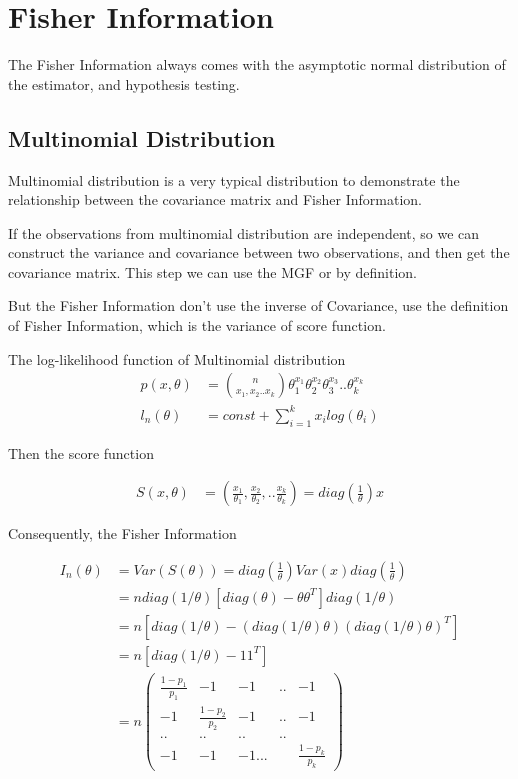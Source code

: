 \documentclass[11pt]{article} %
\begin{document}
\section{Fisher Information}

The Fisher Information always comes with the asymptotic normal distribution of the estimator, and hypothesis testing.

\subsection{Multinomial Distribution}
Multinomial distribution is a very typical distribution to demonstrate the relationship between the covariance matrix and Fisher Information.

If the observations from multinomial distribution are independent, so we can construct the variance and covariance between two observations, and then get the covariance matrix. This step we can use the MGF or by definition.

But the Fisher Information don't use the inverse of Covariance, use the definition of Fisher Information, which is the variance of score function.

The log-likelihood function of Multinomial distribution 
\begin{align*}
	p(x, \theta) &= {n \choose x_1, x_2.. x_k} \theta_1^{x_1} \theta_2^{x_2} \theta_3^{x_3}.. \theta_k^{x_k} \\
	l_n(\theta) &= const + \sum_{i=1}^k x_i log(\theta_i)
\end{align*}

Then the score function

\begin{align*}
	S(x, \theta) &= \left(\frac{x_1}{\theta_1}, \frac{x_2}{\theta_2},.. \frac{x_k}{\theta_k} \right) = diag(\frac{1}{\theta}) x
\end{align*}

Consequently, the Fisher Information

\begin{align*}
	I_n(\theta) &= Var(S(\theta)) = diag(\frac{1}{\theta}) Var(x) diag(\frac{1}{\theta})\\
	&= n diag(1/\theta) [diag(\theta) - \theta \theta^T] diag(1/\theta)\\
	&= n \left[ diag(1/\theta) - (diag(1/\theta) \theta) (diag(1/\theta) \theta)^T  \right]\\
	&= n \left[ diag(1/\theta) - 11^T  \right]\\
	&= n \begin{pmatrix}
		\frac{1-p_1}{p_1} & -1 & -1 &.. & -1 \\
		-1 & \frac{1-p_2}{p_2} & -1 &.. &-1 \\
		..&..&..&..& \\
		-1 & -1 & -1... & & \frac{1-p_k}{p_k}
	\end{pmatrix}
\end{align*}
\end{document}
